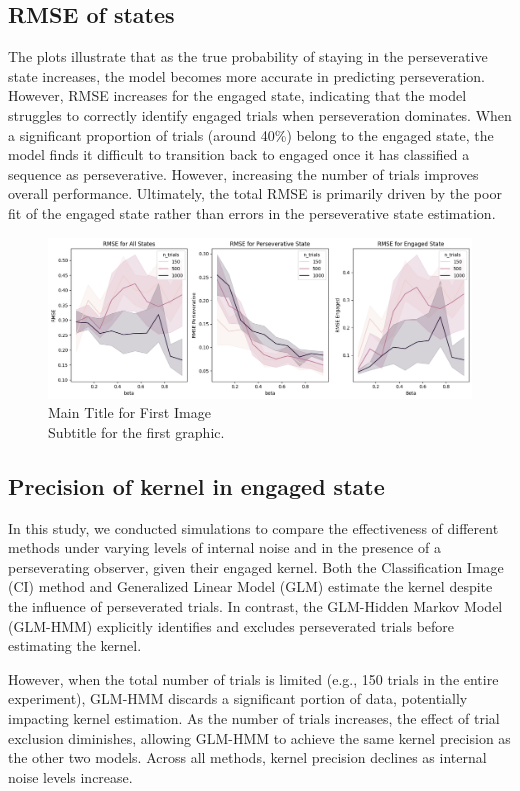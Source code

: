 \subsection{RMSE of states}
The plots illustrate that as the true probability of staying in the perseverative state increases, the model becomes more accurate in predicting perseveration. However, RMSE increases for the engaged state, indicating that the model struggles to correctly identify engaged trials when perseveration dominates. When a significant proportion of trials (around 40\%) belong to the engaged state, the model finds it difficult to transition back to engaged once it has classified a sequence as perseverative. However, increasing the number of trials improves overall performance. Ultimately, the total RMSE is primarily driven by the poor fit of the engaged state rather than errors in the perseverative state estimation.

\begin{figure}[H]
    \centering
    \includegraphics[width=16cm]{MainLayout/Images/chapter7/sim_rmse.png}
    \caption{Main Title for First Image \\ \small Subtitle for the first graphic.}
    \label{fig:bo_glmhmm}
\end{figure}
\subsection{Precision of kernel in engaged state}
In this study, we conducted simulations to compare the effectiveness of different methods under varying levels of internal noise and in the presence of a perseverating observer, given their engaged kernel. Both the Classification Image (CI) method and Generalized Linear Model (GLM) estimate the kernel despite the influence of perseverated trials. In contrast, the GLM-Hidden Markov Model (GLM-HMM) explicitly identifies and excludes perseverated trials before estimating the kernel.

However, when the total number of trials is limited (e.g., 150 trials in the entire experiment), GLM-HMM discards a significant portion of data, potentially impacting kernel estimation. As the number of trials increases, the effect of trial exclusion diminishes, allowing GLM-HMM to achieve the same kernel precision as the other two models. Across all methods, kernel precision declines as internal noise levels increase.

